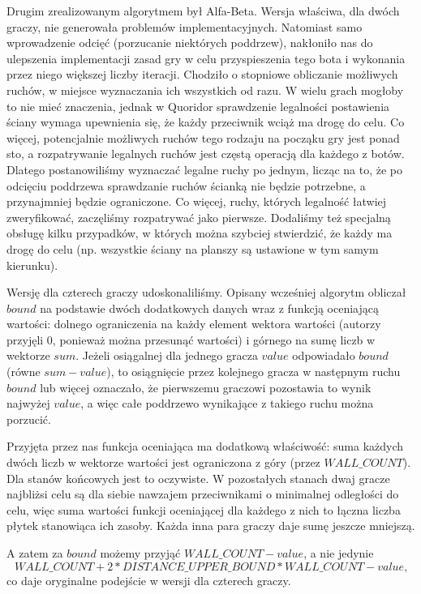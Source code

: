 \documentclass{pracamgr}
\begin{document}
Drugim zrealizowanym algorytmem był Alfa-Beta.
Wersja właściwa, dla dwóch graczy, nie generowała problemów implementacyjnych.
Natomiast samo wprowadzenie odcięć (porzucanie niektórych poddrzew), nakłoniło nas do ulepszenia implementacji zasad gry w celu przyspieszenia tego bota i wykonania przez niego większej liczby iteracji.
Chodziło o stopniowe obliczanie możliwych ruchów, w miejsce wyznaczania ich wszystkich od razu.
W wielu grach mogłoby to nie mieć znaczenia, jednak w Quoridor sprawdzenie legalności postawienia ściany wymaga upewnienia się, że każdy przeciwnik wciąż ma drogę do celu.
Co więcej, potencjalnie możliwych ruchów tego rodzaju na począku gry jest ponad sto, a rozpatrywanie legalnych ruchów jest częstą operacją dla każdego z botów.
Dlatego postanowiliśmy wyznaczać legalne ruchy po jednym, licząc na to, że po odcięciu poddrzewa sprawdzanie ruchów ścianką nie będzie potrzebne, a przynajmniej będzie ograniczone.
Co więcej, ruchy, których legalność łatwiej zweryfikować, zaczęliśmy rozpatrywać jako pierwsze.
Dodaliśmy też specjalną obsługę kilku przypadków, w których można szybciej stwierdzić, że każdy ma drogę do celu (np. wszystkie ściany na planszy są ustawione w tym samym kierunku).

Wersję dla czterech graczy udoskonaliliśmy.
Opisany wcześniej algorytm obliczał \(bound\) na podstawie dwóch dodatkowych danych wraz z funkcją oceniającą wartości: dolnego ograniczenia na każdy element wektora wartości (autorzy przyjęli 0, ponieważ można przesunąć wartości) i górnego na sumę liczb w wektorze \(sum\).
Jeżeli osiągalnej dla jednego gracza \(value\) odpowiadało \(bound\) (równe \(sum - value\)), to osiągnięcie przez kolejnego gracza w następnym ruchu \(bound\) lub więcej oznaczało, że pierwszemu graczowi pozostawia to wynik najwyżej \(value\), a więc całe poddrzewo wynikające z takiego ruchu można porzucić.

Przyjęta przez nas funkcja oceniająca ma dodatkową właściwość: suma każdych dwóch liczb w wektorze wartości jest ograniczona z góry (przez \(WALL\_COUNT\)).
Dla stanów końcowych jest to oczywiste.
W pozostałych stanach dwaj gracze najbliżsi celu są dla siebie nawzajem przeciwnikami o minimalnej odległości do celu, więc suma wartości funkcji oceniającej dla każdego z nich to łączna liczba płytek stanowiąca ich zasoby.
Każda inna para graczy daje sumę jeszcze mniejszą.

A zatem za \(bound\) możemy przyjąć \(WALL\_COUNT - value\), a nie jedynie \[WALL\_COUNT + 2 * DISTANCE\_UPPER\_BOUND * WALL\_COUNT - value\text{,}\] co daje oryginalne podejście w wersji dla czterech graczy.
\end{document}
